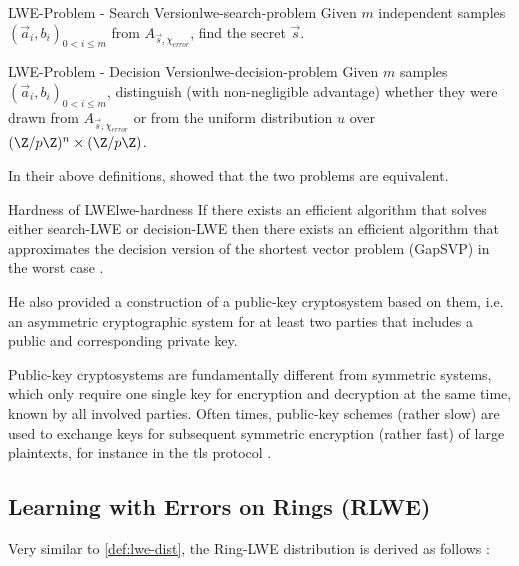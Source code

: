 \begin{definition}{LWE-Problem - Search Version}{lwe-search-problem}
  Given $m$ independent samples $(\vec{a}_i, b_i)_{0 < i \leq m}$ from $A_{\vec{s}, \chi_{error}}$, find the secret $\vec{s}$.
\end{definition}
\begin{definition}{LWE-Problem - Decision Version}{lwe-decision-problem}
  Given $m$ samples $(\vec{a}_i, b_i)_{0 < i \leq m}$, distinguish (with non-negligible advantage) whether they were drawn from $A_{\vec{s}, \chi_{error}}$ or from the uniform distribution $u$ over $(\Z / p \Z)^n \times (\Z / p \Z)$.
\end{definition}

In their above definitions, \citeauthor{2005-lwe-original} showed that the two problems are equivalent.

\begin{theorem}{Hardness of LWE}{lwe-hardness}
  If there exists an efficient algorithm that solves either search-LWE or decision-LWE then there exists an efficient algorithm that approximates the decision version of the shortest vector problem (GapSVP) in the worst case \parencite{2010-lwe-survey}.
\end{theorem}

He also provided a construction of a public-key cryptosystem based on them, i.e. an asymmetric cryptographic system for at least two parties that includes a public and corresponding private key.

Public-key cryptosystems are fundamentally different from symmetric systems, which only require one single key for encryption and decryption at the same time, known by all involved parties.
Often times, public-key schemes (rather slow) are used to exchange keys for subsequent symmetric encryption (rather fast) of large plaintexts, for instance in the \gls{tls} protocol \parencite{rfc8446}.

\subsection{Learning with Errors on Rings (RLWE)}
Very similar to \autoref{def:lwe-dist}, the Ring-LWE distribution is derived as follows \parencite{2010-rlwe-original}:

